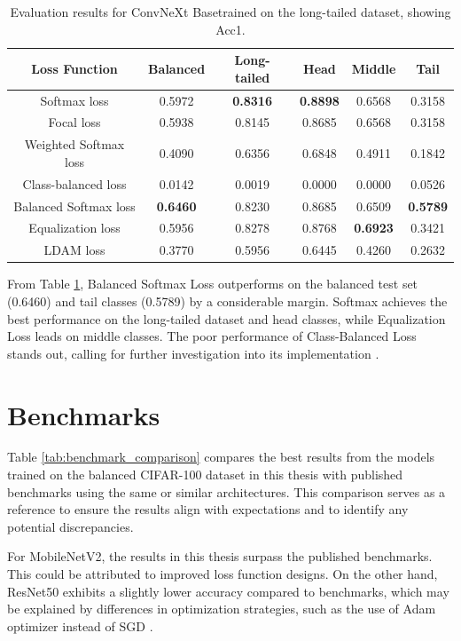 \begin{table}[h!]
    \centering
    \caption{Evaluation results for ConvNeXt Basetrained on the long-tailed dataset, showing Acc1.}
    \begin{tabular}{cccccc}
        \toprule
        Loss Function & Balanced & Long-tailed & Head & Middle & Tail \\ 
        \midrule
        Softmax loss   & 0.5972 & \textbf{0.8316} & \textbf{0.8898} & 0.6568 & 0.3158 \\
        Focal loss   & 0.5938 & 0.8145 & 0.8685 & 0.6568 & 0.3158 \\
        Weighted Softmax loss   & 0.4090 & 0.6356 & 0.6848 & 0.4911 & 0.1842 \\
        Class-balanced loss   & 0.0142 & 0.0019 & 0.0000 & 0.0000 & 0.0526 \\
        Balanced Softmax loss   & \textbf{0.6460} & 0.8230 & 0.8685 & 0.6509 & \textbf{0.5789} \\
        Equalization loss   & 0.5956 & 0.8278 & 0.8768 & \textbf{0.6923} & 0.3421 \\
        LDAM loss   & 0.3770 & 0.5956 & 0.6445 & 0.4260 & 0.2632 \\
        \bottomrule
    \end{tabular}
    \label{tab:conv_lt_acc1_1}
\end{table}

From Table \ref{tab:conv_lt_acc1_1}, Balanced Softmax Loss outperforms on the balanced test set (0.6460) and tail classes (0.5789) by a considerable margin. Softmax achieves the best performance on the long-tailed dataset and head classes, while Equalization Loss leads on middle classes. The poor performance of Class-Balanced Loss stands out, calling for further investigation into its implementation . 

\section{Benchmarks}
Table \ref{tab:benchmark_comparison} compares the best results from the models trained on the balanced CIFAR-100 dataset in this thesis with published benchmarks using the same or similar architectures. This comparison serves as a reference to ensure the results align with expectations and to identify any potential discrepancies. 

For MobileNetV2, the results in this thesis surpass the published benchmarks. This could be attributed to improved loss function designs. On the other hand, ResNet50 exhibits a slightly lower accuracy compared to benchmarks, which may be explained by differences in optimization strategies, such as the use of Adam optimizer instead of SGD \cite{menon2021longtaillearninglogitadjustment}.


